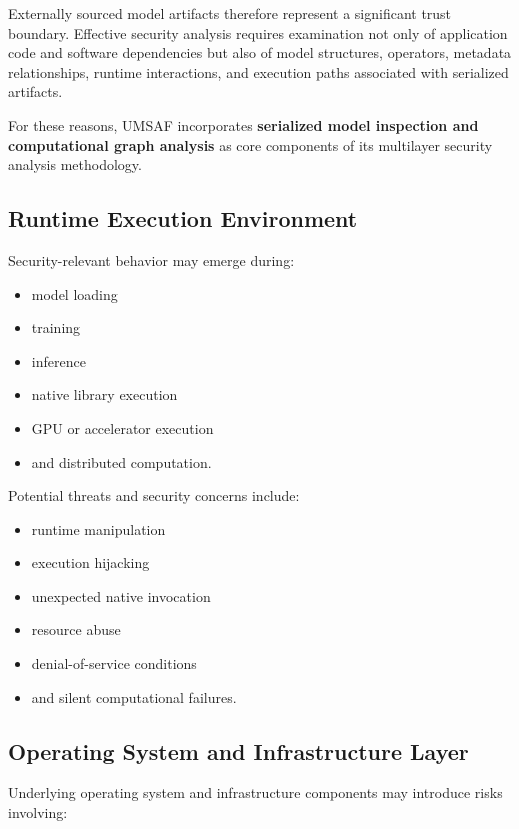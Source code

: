 \documentclass[
  12pt,
  letterpaper,
  oneside]{report}
\providecommand{\tightlist}{%
  \setlength{\itemsep}{0pt}\setlength{\parskip}{0pt}}
\begin{document}
Externally sourced model artifacts therefore represent a significant
trust boundary. Effective security analysis requires examination not
only of application code and software dependencies but also of model
structures, operators, metadata relationships, runtime interactions, and
execution paths associated with serialized artifacts.

For these reasons, UMSAF incorporates \textbf{serialized model
inspection and computational graph analysis} as core components of its
multilayer security analysis methodology.

\subsection{Runtime Execution Environment}\label{645-runtime-execution-environment}

Security-relevant behavior may emerge during:

\begin{itemize}
\tightlist
\item
  model loading
\item
  training
\item
  inference
\item
  native library execution
\item
  GPU or accelerator execution
\item
  and distributed computation.
\end{itemize}

Potential threats and security concerns include:

\begin{itemize}
\tightlist
\item
  runtime manipulation
\item
  execution hijacking
\item
  unexpected native invocation
\item
  resource abuse
\item
  denial-of-service conditions
\item
  and silent computational failures.
\end{itemize}

\subsection{Operating System and Infrastructure Layer}\label{646-operating-system-and-infrastructure-layer}

Underlying operating system and infrastructure components may introduce
risks involving:
\end{document}
